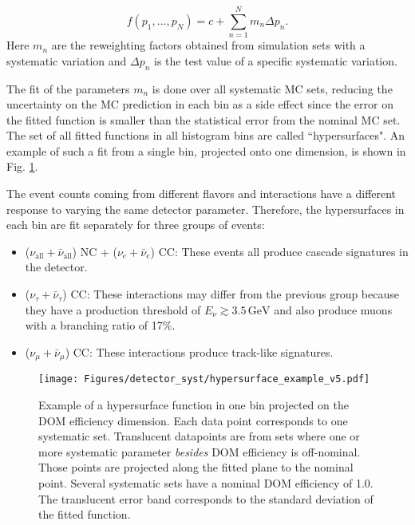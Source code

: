 \begin{equation}
    f(p_1,...,p_N)=c+\sum_{n=1}^N m_n \Delta p_n.
\end{equation}
Here $m_n$ are the reweighting factors obtained from simulation sets with a systematic variation and $\Delta p_n$ is the test value of a specific systematic variation.

The fit of the parameters $m_n$ is done over all systematic MC sets, reducing the uncertainty on the MC prediction in each bin as a side effect since the error on the fitted function is smaller than the statistical error from the nominal MC set. The set of all fitted functions in all histogram bins are called ``hypersurfaces". An example of such a fit from a single bin, projected onto one dimension, is shown in Fig. \ref{fig:hypersurface-example}. %

The event counts coming from different flavors and interactions have a different response to varying the same detector parameter. Therefore, the hypersurfaces in each bin are fit separately for three groups of events:
\begin{itemize}
    \item ($\nu_{\mathrm{all}} + \bar{\nu}_{\mathrm{all}}$) NC + ($\nu_e + \bar{\nu}_e$) CC: These events all produce cascade signatures in the detector.
    \item ($\nu_\tau + \bar{\nu}_\tau$) CC: These interactions may differ from the previous group because they have a production threshold of $E_\nu \gtrsim 3.5\,\mathrm{GeV}$ and also produce muons with a branching ratio of 17\%.
    \item ($\nu_\mu + \bar{\nu}_\mu$) CC: These interactions produce track-like signatures.
\end{itemize}

\begin{figure}[t!]
    \centering
    \texttt{[image: Figures/detector\_syst/hypersurface\_example\_v5.pdf]}
    \caption{Example of a hypersurface function in one bin projected on the DOM efficiency dimension. Each data point corresponds to one systematic set. Translucent datapoints are from sets where one or more systematic parameter \emph{besides} DOM efficiency is off-nominal. Those points are projected along the fitted plane to the nominal point. Several systematic sets have a nominal DOM efficiency of 1.0. The translucent error band corresponds to the standard deviation of the fitted function.}
    \label{fig:hypersurface-example}
\end{figure}

